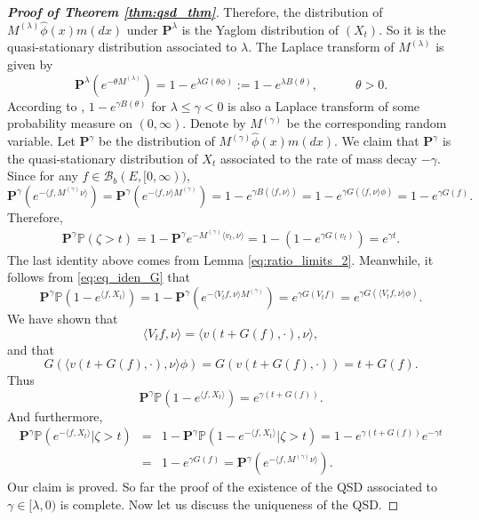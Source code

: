 \documentclass[12pt,a4paper]{amsart}
\numberwithin{equation}{section}
\theoremstyle{plain}
\theoremstyle{definition}
\begin{document}
{\begin{proof}[{\bf Proof of Theorem \ref{thm:qsd_thm}}]
  Therefore, the distribution of $M^{(\lambda)}\widehat\phi(x)m(dx)$ under $\mathbf P^{\lambda }$ is the Yaglom distribution of $(X_t)$.  So it is the quasi-stationary distribution associated to $\lambda$.  The Laplace transform of $M^{(\lambda)}$ is given by
  \begin{equation}\label{eq:def_of_Y}
    \mathbf P^{\lambda}(e^{-\theta M^{(\lambda)}})=1-e^{\lambda G(\theta\phi)}:=1-e^{\lambda B(\theta)},\qquad\quad\theta>0.
  \end{equation}
  According to \cite[Lemma $3.2$]{Lambert2007Quasistationary}, $1-e^{\gamma B(\theta)}$ for $\lambda\leq \gamma<0$ is also a Laplace transform of some probability measure on $(0,\infty)$.  Denote by $M^{(\gamma)}$ be the corresponding random variable.  Let $\mathbf P^{\gamma}$ be the distribution of $M^{(\gamma)}\widehat\phi(x)m(dx)$.  We claim that $\mathbf P^{\gamma}$ is the quasi-stationary distribution of $X_t$ associated to the rate of mass decay $-\gamma$.  Since for any $f\in\mathcal B_b(E,[0,\infty))$,
  \[
    \mathbf P^{\gamma}(e^{-\langle f,M^{(\gamma)}\nu\rangle })=\mathbf P^{\gamma}(e^{-\langle f,\nu\rangle M^{(\gamma)}})=1-e^{\gamma B(\langle f,\nu\rangle )}=1-e^{\gamma G(\langle f,\nu\rangle \phi)}=1-e^{\gamma G(f)}.
  \]
  Therefore,
  \begin{eqnarray*}
    \mathbf P^{\gamma}\mathbb P(\zeta>t)=1-\mathbf P^{\gamma}e^{-M^{(\gamma)}\langle v_t,\nu\rangle }=1-(1-e^{\gamma G(v_t)})=e^{\gamma t}.
  \end{eqnarray*}
  The last identity above comes from Lemma \ref{eq:ratio_limits_2}. Meanwhile, it follows from \eqref{eq:eq_iden_G} that
  \[
    \mathbf P^{\gamma}\mathbb P\left(1-e^{\langle f, X_t\rangle }\right)=1-\mathbf P^{\gamma}\left(e^{-\langle V_tf,\nu\rangle M^{(\gamma)}}\right)
    =e^{\gamma G(V_tf)}=e^{\gamma G(\langle V_tf,\nu\rangle\phi)}.
  \]
  We have shown that
  \begin{equation}\label{eq:ident_Vv}
    \langle V_tf,\nu\rangle =\langle v(t+G(f),\cdot),\nu\rangle,
  \end{equation}
  and that
  \begin{equation}\label{eq:ident_Gv}
    G(\langle v(t+G(f),\cdot),\nu\rangle \phi)=G(v(t+G(f),\cdot))=t+G(f).
  \end{equation}
  Thus
  \[
    \mathbf P^{\gamma}\mathbb P\left(1-e^{\langle f, X_t\rangle }\right)=e^{\gamma(t+G(f))}.
  \]
  And furthermore,
  \begin{eqnarray*}
    \mathbf P^{\gamma}\mathbb P\left(e^{-\langle f, X_t\rangle }\big|\zeta>t\right)&=&1-\mathbf P^{\gamma}\mathbb P\left(1-e^{-\langle f, X_t\rangle }\big|\zeta>t\right)=1-e^{\gamma(t+G(f))}e^{-\gamma t}\\
                                                                                   &=&1-e^{\gamma G(f)}=\mathbf P^{\gamma}(e^{-\langle f,M^{(\gamma)}\nu\rangle }).
  \end{eqnarray*}
  Our claim is proved.  So far the proof of the existence of the QSD associated to $\gamma\in[\lambda,0)$ is complete.  Now let us discuss the uniqueness of the QSD.


\end{proof}}
\end{document}
